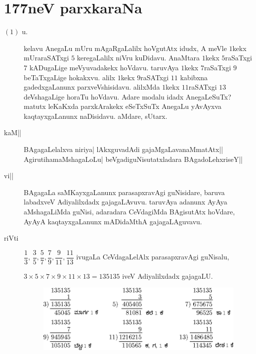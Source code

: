 \chapter{177neV parxkaraNa}


\begin{description}
\item[$(1)$ u.] kelavu AnegaLu mUru mAgaRgaLalilx hoVgutAtx idudx, A
  meVle $1$kekx mUraraSATxgi $5$ keregaLalilx niVru kuDidavu. AnaMtara
  $1$kekx $5$raSaTxgi $7$ kADugaLige meVyuvadakekx hoVdavu. taruvAya
  $1$kekx $7$raSaTxgi $9$ beTaTxgaLige hokakxvu. alilx $1$kekx
  $9$raSATxgi $11$ kabibxna gadedxgaLanunx parxveVshisidavu. alilxMda
  $1$kekx $11$raSATxgi $13$ deVshagaLige horaTu hoVdavu. Adare modalu
  idadx AnegaLeSuTx? matutx leKaKxda parxkArakekx eSeTxSuTx AnegaLu
  yAvAyxva kaqtayxgaLanunx naDisidavu. aMdare, sUtarx.

\item[kaM||] BAgagaLelalxva niriya| lAkxguvadAdi
  gajaMgaLavanaMmatAtx|| AgirutihamaMshagaLoLu|
  beVgadiguNisutatxladara BAgadoLehxriseY||

\item[vi||] BAgagaLa saMKayxgaLanunx parasapxravAgi guNisidare, baruva
  labadxveV Adiyalilxdadx gajagaLAvuvu. taruvAya adanunx AyAya
  aMshagaLiMda guNisi, adaradara CeVdagiMda BAgisutAtx hoVdare, AyAyA
  kaqtayxgaLanunx mADidaMthA gajagaLAguvavu.

\item[riVti] $\dfrac{1}{3}$, $\dfrac{3}{5}, \dfrac{5}{7}, \dfrac{7}{9},
  \dfrac{9}{11}, \dfrac{11}{13}$ ivugaLa CeVdagaLelAlx parasapxravAgi
  guNisalu, 

  $3 \times 5 \times 7 \times 9 \times 11 \times 13= 135135$
  iveV Adiyalilxdadx gajagaLU.
 \begin{figure}[H]
  \centerline{ \includegraphics{images/177.eps}}
 \end{figure}

\end{description}
